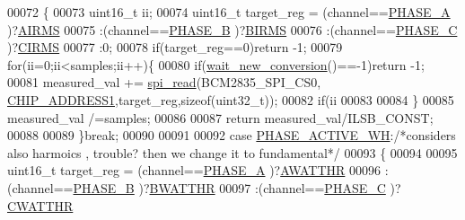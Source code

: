 \begin{DoxyCode}
00072                 \{
00073                     uint16\_t ii;
00074                     uint16\_t target\_reg =  (channel==\hyperlink{a00042_ad214039f52b011ce2bd6c85ff98a981b}{PHASE\_A} )?\hyperlink{a00035_afae37e821d8947e31a63759e4bb57355}{AIRMS}
00075                                           :(channel==\hyperlink{a00042_ad7b96feed1e1c12515dad5e926b2c62e}{PHASE\_B} )?\hyperlink{a00035_ae1cff66a3f5c466b4344a5c2781224df}{BIRMS}
00076                                           :(channel==\hyperlink{a00042_a3ceb83fb10c2af19b468d508448f24e2}{PHASE\_C} )?\hyperlink{a00035_a3ccd0ef2a55b24f358292694724d37a3}{CIRMS}
00077                                           :0;
00078                     \textcolor{keywordflow}{if}(target\_reg==0)\textcolor{keywordflow}{return} -1;     
00079                     \textcolor{keywordflow}{for}(ii=0;ii<samples;ii++)\{
00080                     \textcolor{keywordflow}{if}(\hyperlink{a00002_ga7b6d584350762c53419945480d6958d3}{wait\_new\_conversion}()==-1)\textcolor{keywordflow}{return} -1;
00081                     measured\_val += \hyperlink{a00006_ga7ad9f65ee46aca507374096506a0b1c4}{spi\_read}(BCM2835\_SPI\_CS0,
      \hyperlink{a00036_a94de2b046db6e10257ef4481c0a15eaa}{CHIP\_ADDRESS1},target\_reg,\textcolor{keyword}{sizeof}(uint32\_t)); 
00082                     \textcolor{keywordflow}{if}(ii%
00083                     
00084                     \}
00085                     measured\_val /=samples;
00086                     
00087                     \textcolor{keywordflow}{return} measured\_val/ILSB\_CONST;
00088                 
00089                 \}\textcolor{keywordflow}{break};
00090                 
00091                 
00092                 \textcolor{keywordflow}{case}  \hyperlink{a00042_a4ee773ad07fa969b9990f9bb3a1a2093}{PHASE\_ACTIVE\_WH}:\textcolor{comment}{/*considers also harmoics , trouble? then we change it
       to fundamental*/}
00093                 \{
00094             
00095                     uint16\_t target\_reg =  (channel==\hyperlink{a00042_ad214039f52b011ce2bd6c85ff98a981b}{PHASE\_A} )?\hyperlink{a00035_ae66c97ed86f47fd938f143a30a8b2f7e}{AWATTHR}
00096                                           :(channel==\hyperlink{a00042_ad7b96feed1e1c12515dad5e926b2c62e}{PHASE\_B} )?\hyperlink{a00035_a185c6910fa47f7e973f0f8743ef0e8ad}{BWATTHR}
00097                                           :(channel==\hyperlink{a00042_a3ceb83fb10c2af19b468d508448f24e2}{PHASE\_C} )?\hyperlink{a00035_ad685baf76950c0387bedffa9bb3272a9}{CWATTHR}

\end{DoxyCode}
